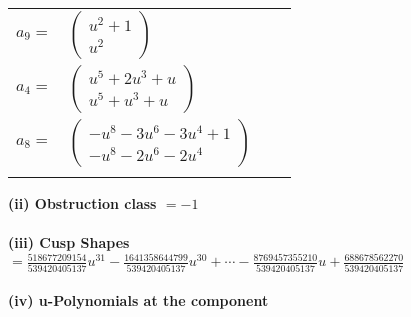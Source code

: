 \documentclass[1p]{elsarticle_modified}
\theoremstyle{definition}
\begin{document}
\begin{tabular}{m{7pt} m{180pt} m{7pt} m{180pt} }
\flushright $a_{9}=$&$\begin{pmatrix}u^2+1\\u^2\end{pmatrix}$ \\
\flushright $a_{4}=$&$\begin{pmatrix}u^5+2 u^3+u\\u^5+u^3+u\end{pmatrix}$ \\
\flushright $a_{8}=$&$\begin{pmatrix}- u^8-3 u^6-3 u^4+1\\- u^8-2 u^6-2 u^4\end{pmatrix}$\\&\end{tabular}
\flushleft \textbf{(ii) Obstruction class $= -1$}\\~\\
\flushleft \textbf{(iii) Cusp Shapes $= \frac{518677209154}{539420405137} u^{31}-\frac{1641358644799}{539420405137} u^{30}+\cdots-\frac{8769457355210}{539420405137} u+\frac{688678562270}{539420405137}$}\\~\\
\newpage\renewcommand{\arraystretch}{1}
\flushleft \textbf{(iv) u-Polynomials at the component}\newline \\
\end{document}
